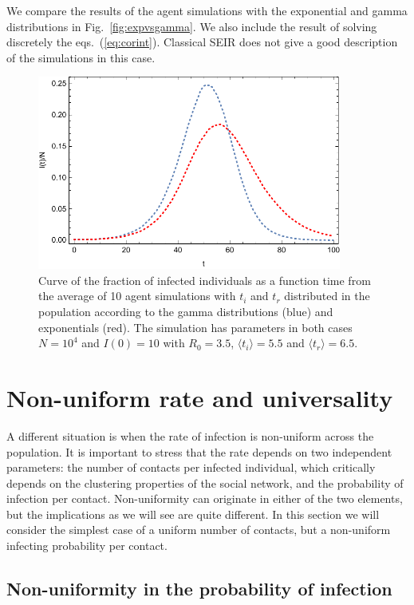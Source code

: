 \documentclass[a4paper,oneside,11pt]{article}
\begin{document}
We compare the results of the agent simulations with the exponential and gamma distributions in Fig.~\ref{fig:expvsgamma}. We also include the result of solving discretely the eqs.~(\ref{eq:corint}). Classical SEIR does not give a good description of the simulations in this case.
\begin{figure}[h!]
  \centering
  \includegraphics[width=10cm]{expvsgamma.pdf}
  \caption{ Curve of the fraction of infected individuals as a function time from the average of 10 agent simulations with $t_i$ and $t_r$ distributed in the population according to the gamma distributions (blue) and exponentials (red). The simulation has parameters in both cases $N=10^4$ and $I(0)=10$ with $R_0=3.5$, $\langle t_i\rangle=5.5$ and $\langle t_r\rangle=6.5$.  }
  \label{fig:exp}
   \end{figure}

\section{Non-uniform rate and universality }
\label{sec:r}
A different situation is when the rate of infection is non-uniform across the population. It is important to stress that the rate depends on two independent parameters: the number of contacts per infected individual, which critically depends on the clustering properties of the social network,  and the probability of infection per contact. Non-uniformity can originate in either of the two elements, but the implications as we will see are quite different. In this section we will consider the simplest case of a uniform number of contacts, but a non-uniform infecting probability per contact.

\subsection{Non-uniformity in the probability of infection}
\label{sec:prob}
\end{document}
